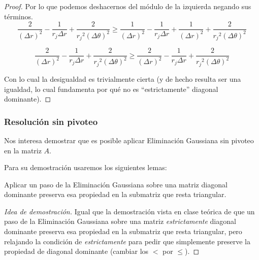 \begin{proposition}
\begin{proof}
Por lo que podemos deshacernos del módulo de la izquierda negando sus términos. 
$$\frac{2}{(\Delta r)^2} - \frac{1}{r_j \Delta r} + \frac{2}{{r_j}^2 (\Delta \theta)^2} \geq \frac{1}{(\Delta r)^2} - \frac{1}{r_j \Delta r} + \frac{1}{(\Delta r)^2} + \frac{2}{{r_j}^2(\Delta \theta)^2} $$

$$\frac{2}{(\Delta r)^2} - \frac{1}{r_j \Delta r} + \frac{2}{{r_j}^2 (\Delta \theta)^2} \geq \frac{2}{(\Delta r)^2} - \frac{1}{r_j \Delta r} + \frac{2}{{r_j}^2(\Delta \theta)^2} $$

Con lo cual la desigualdad es trivialmente cierta (y de hecho resulta ser una igualdad, lo cual fundamenta por qué no es ``estrictamente'' diagonal dominante).
\end{proof}
\end{proposition}
\subsubsection{Resolución sin pivoteo}
Nos interesa demostrar que es posible aplicar Eliminación Gaussiana sin pivoteo en la matriz $A$.

Para su demostración usaremos los siguientes lemas:
\begin{lemma}\label{submatriz}
 Aplicar un paso de la Eliminación Gaussiana sobre una matriz diagonal dominante preserva esa propiedad en la submatriz que resta triangular.
\end{lemma}
\begin{proof}[Idea de demostración]
 Igual que la demostración vista en clase teórica de que un paso de la Eliminación Gaussiana sobre una matriz \emph{estrictamente} diagonal dominante preserva esa propiedad en la submatriz que resta triangular, pero relajando la condición de \emph{estrictamente} para pedir que simplemente preserve la propiedad de diagonal dominante (cambiar los $<$ por $\leq$).
\end{proof}

